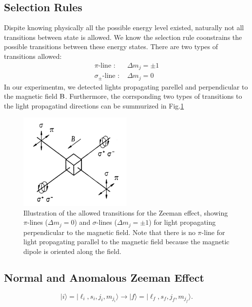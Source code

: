 \documentclass[a4paper,12pt]{article}
\begin{document}
\subsection{Selection Rules}
Dispite knowing physically all the possible energy level existed, naturally not all transitions between state is allowed. We know the selection rule coonstrains the possible transitions between these energy states. There are two types of transitions allowed: 
\begin{align}
    \text{$\pi$-line : }&\Delta m_j = \pm 1\\ 
    \text{$\sigma_{\pm}$-line : }&\Delta m_j = 0 
\end{align}
\indent In our experimentm, we detected lights propagating parellel and perpendicular to the magnetic field $\bold{\mathrm{B}}$. Furthermore, the corrsponding two types of transitions to the light propagatind directions can be summurized in Fig.\ref{fig:zeeman_effect_1}
\begin{figure}[H]
    \centering
    \includegraphics[width=0.5\textwidth]{Zeeman_effect_1.png}
    \caption{Illustration of the allowed transitions for the Zeeman effect, showing $\pi$-lines ($\Delta m_j = 0$) and $\sigma$-lines ($\Delta m_j = \pm 1$) for light propagating perpendicular to the magnetic field. Note that there is no $\pi$-line for light propagating parallel to the magnetic field because the magnetic dipole is oriented along the field. \cite{phyweZeeman}}
    \label{fig:zeeman_effect_1}
\end{figure}

\subsection{Normal and Anomalous Zeeman Effect}
\begin{equation}
    \mid i \rangle = \mid \ell_i, s_i, j_i, m_{j_i} \rangle \to \mid f \rangle = \mid \ell_f, s_f, j_f, m_{j_f} \rangle.
\end{equation}
\end{document}

